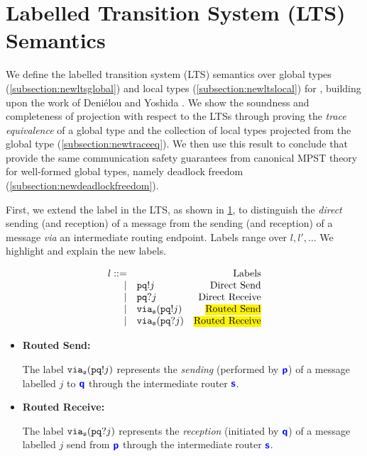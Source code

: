 \section{Labelled Transition System (LTS) Semantics}
\label{section:lts}

We define the labelled transition system (LTS) semantics
over global types (\cref{subsection:newltsglobal}) 
and local types (\cref{subsection:newltslocal})
for \newtheory,
building upon the work of Deni\'elou and Yoshida
\cite{characterisation}.
We show the soundness and completeness of projection
with respect to the LTSs through proving the
\textit{trace equivalence} of
a global type and the collection of local types projected
from the global type (\cref{subsection:newtraceeq}).
We then use this result to
conclude that \newtheory provide the same
communication safety guarantees from canonical
MPST theory for well-formed global types, 
namely deadlock freedom (\cref{subsection:newdeadlockfreedom}).

First, we extend the label in the LTS, as shown in 
\cref{fig:newlts}, to distinguish
the \textit{direct} sending (and reception) of a message
from the sending (and reception) of a message
\textit{via} an intermediate routing endpoint.
Labels range over $l, l', \dots$
We highlight and explain the new labels.

\begin{figure}[!h]
\doublespacing
\[
\begin{array}{rlr}
l ::= & & \text{Labels} \\
	\mid & \aout{p}{q}{j} & 
		\text{Direct Send} \\
	\mid & \ain{p}{q}{j} & 
		\text{Direct Receive} \\
	\mid & \via{s}{\aout{p}{q}{j}} & 
		\text{\hl{Routed Send}} \\
	\mid & \via{s}{\ain{p}{q}{j}} & 
		\text{\hl{Routed Receive}} \\
\end{array}
\]
\singlespacing
{}
\label{fig:newlts}
\end{figure}

\begin{itemize}
\item \textbf{Routed Send:}

The label ${\texttt{via}_{{\mathtt{s}}}({{\mathtt{p}}{\mathtt{q}}!{j}})}$ represents the
\textit{sending} (performed by ${\color{blue}\bm{\mathsf{p}}}$)
of a message labelled $j$ to ${\color{blue}\bm{\mathsf{q}}}$ through
the intermediate router ${\color{blue}\bm{\mathsf{s}}}$.

\item \textbf{Routed Receive:}

The label ${\texttt{via}_{{\mathtt{s}}}({{\mathtt{p}}{\mathtt{q}}?{j}})}$ represents the
\textit{reception} (initiated by ${\color{blue}\bm{\mathsf{q}}}$) 
of a message labelled $j$
send from ${\color{blue}\bm{\mathsf{p}}}$ through
the intermediate router ${\color{blue}\bm{\mathsf{s}}}$.
\end{itemize}

